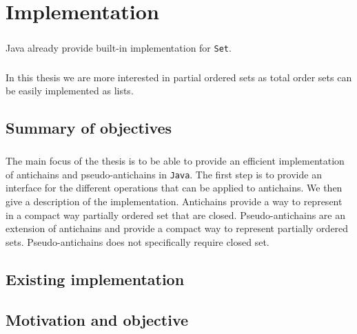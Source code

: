 \documentclass[letterpaper]{memoir}
\begin{document}
\chapter{Implementation}

\paragraph{}

Java already provide built-in implementation for \texttt{Set}.

\paragraph{}


In this thesis we are more interested in partial ordered sets as
total order sets can be easily implemented as lists.

\section{Summary of objectives}

\paragraph{}


The main focus of the thesis is to be able to provide an efficient
implementation of antichains and pseudo-antichains in \texttt{Java}.
The first step is to provide an interface for the different operations that
can be applied to antichains. We then give a description of the implementation.
Antichains provide a way to represent
in a compact way partially ordered set that are closed. Pseudo-antichains
are an extension of antichains and provide a compact way to represent
partially ordered sets. Pseudo-antichains does not specifically require
closed set.



\section{Existing implementation}





\section{Motivation and objective}
\end{document}
